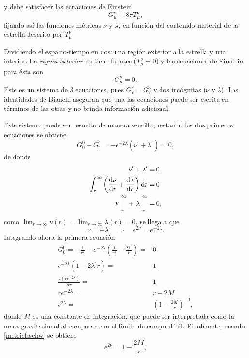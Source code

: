 y debe satisfacer las ecuaciones de Einstein
\begin{equation}
    G _ { \mu } ^ { \nu }  = 8 \pi T _ { \mu } ^ { \nu },
\end{equation}
fijando así las funciones métricas $\nu$ y $\lambda$, en función del contenido material de la estrella descrito por $T _ { \mu } ^ { \nu }$.

Dividiendo el espacio-tiempo en dos: una región exterior a la estrella y una interior. 
La \textit{región exterior} no tiene fuentes ($T _ { \mu } ^ { \nu }=0$) y las ecuaciones de Einstein para ésta son 
\begin{equation}
    G _ { \mu } ^ { \nu } = 0.
\end{equation}
Este es un sistema de 3 ecuaciones, pues $ G _ { 2 } ^ { 2}=G _ { 3 } ^ { 3}$ y dos incógnitas ($\nu$ y $\lambda$). Las identidades de Bianchi aseguran que una las ecuaciones puede ser escrita en términos de las otras y no brinda información adicional.

Este sistema puede ser resuelto de manera sencilla, restando las dos primeras ecuaciones se obtiene
\begin{equation*}
    G _ { 0 } ^ { 0} - G _ { 1 } ^ { 1} = -e^{-2\lambda} (\nu^{\prime}+\lambda^{\prime}) = 0, 
\end{equation*}
de donde
\begin{align*}
    \nu^{\prime}+\lambda^{\prime} =& \,0 \\
    \int_{r}^{\infty} \qty(\dv{\nu}{r}+\dv{\lambda}{r})\dd{r} =& \,0 \\
    \eval{\nu}_{r}^{\infty} + \eval{\lambda}_{r}^{\infty} =& \, 0,
\end{align*}
como $\lim_{r\to \infty}\nu(r)=\lim_{r\to \infty}\lambda(r)=0$, se llega a que
\begin{equation}
    \nu=-\lambda \quad \Longrightarrow \quad e^{2\nu}=e^{-2\lambda}. \label{metricfsschw}
\end{equation}
Integrando ahora la primera ecuación
\begin{align}
    G _ { 0 } ^ { 0} = -\frac{1}{r^{2}}+e^{-2\lambda}\left(\frac{1}{r^{2}}-\frac{2 \lambda^{\prime}}{r}\right) =& 0 \nonumber \\
    e^{-2\lambda}\left(1-2 \lambda^{\prime} r \right) =& 1 \nonumber \\
    \frac{d\left(r e^{-2 \lambda}\right)}{d r} =& 1 \nonumber \\ 
    r e^{-2 \lambda} =& r - 2 M  \nonumber \\
    e^{2 \lambda} =& \left(1-\frac{2 M}{r}\right)^{-1},
\end{align}
donde $M$ es una constante de integración, que puede ser interpretada como la masa gravitacional al comparar con el límite de campo débil. Finalmente, usando \eqref{metricfsschw} se obtiene
\begin{equation}
    e^{2\nu}=1-\frac{2 M}{r},
\end{equation}

